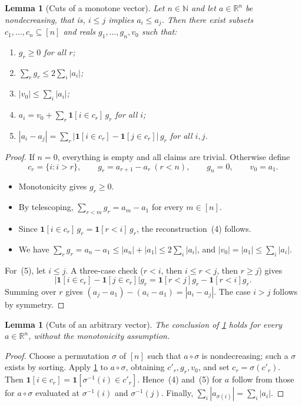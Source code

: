 \documentclass[11pt]{article}
\newtheorem{lemma}[theorem]{Lemma}
\theoremstyle{definition}
\theoremstyle{remark}
\newcommand{\R}{\mathbb{R}}
\newcommand{\N}{\mathbb{N}}
\newcommand{\one}{\mathbf{1}}
\begin{document}
\begin{lemma}[Cuts of a monotone vector]\label{lem:mc_cut_real_mono}
Let $n\in\N$ and let $a\in\R^n$ be nondecreasing, that is, $i\le j$ implies $a_i\le a_j$. Then there exist subsets $c_1,\dots,c_n\subseteq[n]$ and reals $g_1,\dots,g_n,v_0$ such that:
\begin{enumerate}
\item $g_r\ge0$ for all $r$;
\item $\sum_rg_r\le2\sum_i|a_i|$;
\item $|v_0|\le\sum_i|a_i|$;
\item $a_i=v_0+\sum_r\one[i\in c_r]\,g_r$ for all $i$;
\item $|a_i-a_j|=\sum_r\bigl|\one[i\in c_r]-\one[j\in c_r]\bigr|\,g_r$ for all $i,j$.
\end{enumerate}
\end{lemma}
\begin{proof}
If $n=0$, everything is empty and all claims are trivial. Otherwise define
\[
c_r=\{i: i>r\},\qquad g_r=a_{r+1}-a_r\ (r<n),\qquad g_n=0,\qquad v_0=a_1 .
\]
\begin{itemize}
\item Monotonicity gives $g_r\ge0$.
\item By telescoping, $\sum_{r<m}g_r=a_m-a_1$ for every $m\in[n]$.
\item Since $\one[i\in c_r]\,g_r=\one[r<i]\,g_r$, the reconstruction~(4) follows.
\item We have $\sum_rg_r=a_n-a_1\le|a_n|+|a_1|\le2\sum_i|a_i|$, and $|v_0|=|a_1|\le\sum_i|a_i|$.
\end{itemize}
For~(5), let $i\le j$. A three-case check ($r<i$, then $i\le r<j$, then $r\ge j$) gives
\[
\bigl|\one[i\in c_r]-\one[j\in c_r]\bigr|g_r=\one[r<j]g_r-\one[r<i]g_r .
\]
Summing over $r$ gives $(a_j-a_1)-(a_i-a_1)=|a_i-a_j|$. The case $i>j$ follows by symmetry.
\end{proof}

\begin{lemma}[Cuts of an arbitrary vector]\label{lem:mc_cut_real_pointwise}
The conclusion of \cref{lem:mc_cut_real_mono} holds for every $a\in\R^n$, without the monotonicity assumption.
\end{lemma}
\begin{proof}
Choose a permutation $\sigma$ of $[n]$ such that $a\circ\sigma$ is nondecreasing; such a $\sigma$ exists by sorting. Apply \cref{lem:mc_cut_real_mono} to $a\circ\sigma$, obtaining $c'_r,g_r,v_0$, and set $c_r=\sigma(c'_r)$. Then $\one[i\in c_r]=\one[\sigma^{-1}(i)\in c'_r]$. Hence~(4) and~(5) for $a$ follow from those for $a\circ\sigma$ evaluated at $\sigma^{-1}(i)$ and $\sigma^{-1}(j)$. Finally, $\sum_i|a_{\sigma(i)}|=\sum_i|a_i|$.
\end{proof}
\end{document}
